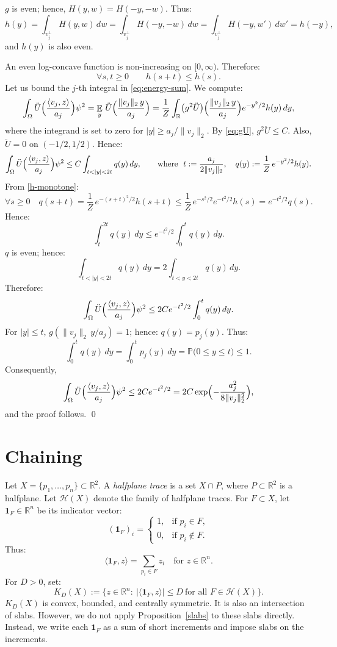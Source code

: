 \documentclass[12pt,reqno]{amsart}
\makeatletter
\renewenvironment{proof}[1][\proofname]{%
  \par\vspace{\topsep}%
  \normalfont\topsep6\p@\@plus6\p@\relax
  \trivlist
  \item[\hskip\labelsep\itshape #1\@addpunct{.}]\ignorespaces
}{%
  \endtrivlist
}
\numberwithin{equation}{section}
\DeclareMathOperator{\E}{\mathbb{E}}
\newcommand{\one}{\mathbf{1}}
\def \R {\mathbb{R}}
\makeatother
\begin{document}
\begin{proof}
\(g\) is even; hence, \(H(y,w)=H(-y,-w)\). Thus:
\[
h(y)=\int_{v_j^\perp}H(y,w)\,dw=
\int_{v_j^\perp}H(-y,-w)\,dw=
\int_{v_j^\perp}H(-y,w')\,dw'=h(-y),
\]
and \(h(y)\) is also even.
\smallskip%
 
An even log-concave function is non-increasing on \([0,\infty)\). Therefore:
\begin{equation}\label{h-monotone}
\forall s,t\ge0\qquad h(s+t)\le h(s).
\end{equation}
Let us bound the \(j\)-th integral in \eqref{eq:energy-sum}. We compute:
\[
\int_\Omega\ddot U\Bigl(\frac{\langle v_j,z\rangle}{a_j}\Bigr)\psi^2
=\E_y\,\ddot U\Bigl(\frac{\|v_j\|_2\,y}{a_j}\Bigr)
=\frac1Z\int_{\R}\bigl(g^2\ddot U\bigr)\Bigl(\frac{\|v_j\|_2\,y}{a_j}\Bigr)e^{-y^2/2}h(y)\,dy,
\]
where the integrand is set to zero for \(|y|\ge a_j/\|v_j\|_2\). By \eqref{eq:gU}, \(g^2\ddot U\le C\). Also, \(\ddot U=0\) on \((-1/2,1/2)\). Hence:
\[
\int_\Omega\ddot U\Bigl(\frac{\langle v_j,z\rangle}{a_j}\Bigr)\psi^2
\le C\int_{t<|y|<2t}q(y)\,dy,
\qquad\text{where }\ t:=\frac{a_j}{2\|v_j\|_2},\quad q(y):=\frac1Z\,e^{-y^2/2}h(y).
\]
From \eqref{h-monotone}:
\[
\forall s \ge 0\quad 
q(s+t) = \frac1Z\,e^{-(s+t)^2/2}h(s+t) \le 
\frac1Z\, e^{-s^2/2} e^{-t^2/2} h(s) = 
e^{-t^2/2} q(s).
\]
Hence:
\[
\int_t^{2t}q(y)\,dy\le e^{-t^2/2}\int_0^{t}q(y)\,dy.
\]
\(q\) is even; hence:
\[
\int_{t<|y|<2t}q(y)\,dy = 2 \int_{t<y<2t}q(y)\,dy.
\]
Therefore:
\[
\int_\Omega\ddot U\Bigl(\frac{\langle v_j,z\rangle}{a_j}\Bigr)\psi^2 \le 2 C e^{-t^2/2}\int_0^{t}q(y)\,dy.
\]
For \(|y|\le t\), \(g(\|v_j\|_2\,y/a_j)=1\); hence: \(q(y)=p_j(y)\). Thus:
\[
\int_{0}^{t} q(y)\,dy=
\int_{0}^{t} p_j(y)\,dy = \mathbb P\bigl(0 \le y \le t\bigr)\le1.
\]
Consequently,
\[
\int_\Omega\ddot U\Bigl(\frac{\langle v_j,z\rangle}{a_j}\Bigr)\psi^2
\le 2C e^{-t^2/2}
=2C \exp\Bigl(-\frac{a_j^2}{8\|v_j\|_2^2}\Bigr),
\]
and the proof follows. \qed
\end{proof}

\section{Chaining}\label{chaining}
Let \(X=\{p_1,\ldots,p_n\}\subset\R^2\). 
A \emph{halfplane trace} is a set \(X\cap P\), where \(P\subset\R^2\) is a halfplane. Let \(\mathcal H(X)\) denote the family of halfplane traces. For \(F\subset X\), let \(\one_F\in\R^n\) be its indicator vector: 
\[
(\one_F)_i = \begin{cases}
1, & \text{if \(p_i\in F\)},\\
0, & \text{if \(p_i\notin F\)}.
\end{cases}
\]
Thus:
\[
\langle\one_F,z\rangle=\sum_{p_i\in F}z_i\quad \text{for \(z\in\R^n\)}.
\]
For \(D>0\), set:
\[
K_D(X):=\bigl\{z\in\R^n:\ |\langle\one_F,z\rangle|\le D\ \text{for all }F\in\mathcal H(X)\bigr\}.
\]
\(K_D(X)\) is convex, bounded, and centrally symmetric. It is also an intersection of 
slabs. However, we do not apply Proposition~\ref{slabs} to these slabs directly. Instead, we write each \(\one_F\) as a sum of short increments and impose slabs on the increments.
\smallskip%
\end{document}
